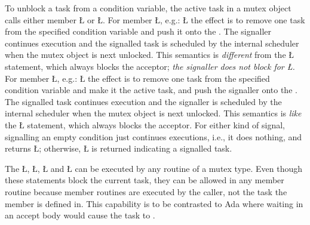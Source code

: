\documentclass[openright,twoside]{report}
\begin{document}
To unblock a task from a condition variable, the active task in a mutex object calls either member \LGinlinetrue\LGbegin\lgrinde\L{}\endlgrinde\LGend{} or \LGinlinetrue\LGbegin\lgrinde\L{}\endlgrinde\LGend{}.
For member \LGinlinetrue\LGbegin\lgrinde\L{}\endlgrinde\LGend{}\label{p:signal}, e.g.:
\LGinlinefalse\LGbegin\lgrinde
\L{}
\endlgrinde\LGend
the effect is to remove one task from the specified condition variable and push it onto the .
The signaller continues execution and the signalled task is scheduled by the internal scheduler when the mutex object is next unlocked.
This semantics is \emph{different} from the \LGinlinetrue\LGbegin\lgrinde\L{}\endlgrinde\LGend{} statement, which always blocks the acceptor;
\emph{the signaller does not block for \LGinlinetrue\LGbegin\lgrinde\L{}\endlgrinde\LGend{}.}
For member \LGinlinetrue\LGbegin\lgrinde\L{}\endlgrinde\LGend{}\label{p:signalBlock}, e.g.:
\LGinlinefalse\LGbegin\lgrinde
\L{}
\endlgrinde\LGend
the effect is to remove one task from the specified condition variable and make it the active task, and push the signaller onto the .
The signalled task continues execution and the signaller is scheduled by the internal scheduler when the mutex object is next unlocked.
This semantics is \emph{like} the \LGinlinetrue\LGbegin\lgrinde\L{}\endlgrinde\LGend{} statement, which always blocks the acceptor.
For either kind of signal, signalling an empty condition just continues executions, i.e., it does nothing, and returns \LGinlinetrue\LGbegin\lgrinde\L{}\endlgrinde\LGend{};
otherwise, \LGinlinetrue\LGbegin\lgrinde\L{}\endlgrinde\LGend{} is returned indicating a signalled task.


\begin{annotation}
The \LGinlinetrue\LGbegin\lgrinde\L{}\endlgrinde\LGend{}, \LGinlinetrue\LGbegin\lgrinde\L{}\endlgrinde\LGend{}, \LGinlinetrue\LGbegin\lgrinde\L{}\endlgrinde\LGend{} and \LGinlinetrue\LGbegin\lgrinde\L{}\endlgrinde\LGend{} can be executed by any routine of a mutex type.
Even though these statements block the current task, they can be allowed in any member routine because member routines are executed by the caller, not the task the member is defined in.
This capability is to be contrasted to Ada where waiting in an accept body would cause the task to .
\end{annotation}
\end{document}
